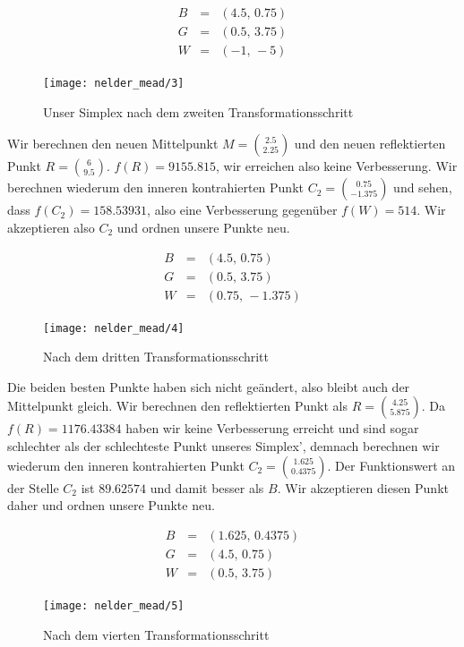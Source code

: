 \documentclass[naustrian]{article}
\begin{document}
{\begin{eqnarray*}
    B & = & (4.5, \, 0.75)\\
    G & = & (0.5,\,3.75)\\
    W & = & (-1,\,-5)
\end{eqnarray*}

\begin{figure}[H]
    \centering
    \texttt{[image: nelder\_mead/3]}
    \caption{Unser Simplex nach dem zweiten Transformationsschritt}
\end{figure}

Wir berechnen den neuen Mittelpunkt $M = \binom{2.5}{2.25}$ und den neuen
reflektierten Punkt $R = \binom{6}{9.5}$. $f(R) = 9155.815$, wir erreichen also
keine Verbesserung. Wir berechnen wiederum den inneren kontrahierten Punkt
$C_{2} = \binom{0.75}{-1.375}$ und sehen, dass $f(C_{2}) = 158.53931$, also
eine Verbesserung gegenüber $f(W) = 514$. Wir akzeptieren also $C_{2}$ und
ordnen unsere Punkte neu.

\begin{eqnarray*}
    B & = & (4.5, \, 0.75)\\
    G & = & (0.5,\,3.75)\\
    W & = & (0.75,\,-1.375)
\end{eqnarray*}

\begin{figure}[H]
    \centering
    \texttt{[image: nelder\_mead/4]}
    \caption{Nach dem dritten Transformationsschritt}
\end{figure}

Die beiden besten Punkte haben sich nicht geändert, also bleibt auch der
Mittelpunkt gleich. Wir berechnen den reflektierten Punkt als $R =
\binom{4.25}{5.875}$. Da $f(R) = 1176.43384$ haben wir keine Verbesserung
erreicht und sind sogar schlechter als der schlechteste Punkt unseres Simplex',
demnach berechnen wir wiederum den inneren kontrahierten Punkt $C_{2} =
\binom{1.625}{0.4375}$. Der Funktionswert an der Stelle $C_{2}$ ist $89.62574$
und damit besser als $B$. Wir akzeptieren diesen Punkt daher und ordnen unsere
Punkte neu.

\begin{eqnarray*}
    B & = & (1.625,\,0.4375)\\
    G & = & (4.5, \, 0.75)\\
    W & = & (0.5,\,3.75)
\end{eqnarray*}

\begin{figure}[H]
    \centering
    \texttt{[image: nelder\_mead/5]}
    \caption{Nach dem vierten Transformationsschritt}
\end{figure}

}
\end{document}
